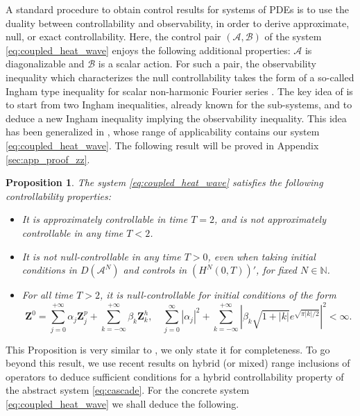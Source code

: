 \documentclass[10pt]{article}
\newtheorem{Proposition}[Theorem]{Proposition}
\begin{document}
A standard procedure to obtain control results for systems of PDEs is to use the duality between controllability and observability, in order to derive approximate, null, or exact controllability. Here, the control pair $(\mathcal{A},\mathcal{B})$ of the system \eqref{eq:coupled_heat_wave} enjoys the following additional properties: $\mathcal{A}$ is diagonalizable and $\mathcal{B}$ is a scalar action. For such a pair, the observability inequality which characterizes the null controllability takes the form of a so-called Ingham type inequality for scalar non-harmonic Fourier series \cite{komornik_loreti}. The key idea of \cite{hansen} is to start from two Ingham inequalities, already known for the sub-systems, and to deduce a new Ingham inequality implying the observability inequality. This idea has been generalized in \cite[Proposition 1.6]{chowdhury}, whose range of applicability contains our system \eqref{eq:coupled_heat_wave}. The following result will be proved in Appendix \ref{sec:app_proof_zz}.
\begin{Proposition}\label{prop:zz_pour_nous}
The system \eqref{eq:coupled_heat_wave} satisfies the following controllability properties: 
\begin{itemize}
\item It is approximately controllable in time $T = 2$, and is not approximately controllable in any time $T < 2$. 
\item It is not null-controllable in any time $T > 0$, even when taking initial conditions in $D(\mathcal{A}^N)$ and controls in $(H^N(0,T))'$, for fixed $N \in \mathbb{N}$.
\item For all time $T > 2$, it is null-controllable for initial conditions of the form
\[
\mathbf{Z}^0 = \sum_{j=0}^{+\infty} \alpha_j \mathbf{Z}_j^p + \sum_{k=-\infty}^{+\infty} \beta_k \mathbf{Z}_k^h,\quad  \sum_{j=0}^\infty |\alpha_j|^2 +  \sum_{k=-\infty}^{+\infty} \left| \beta_k \sqrt{1+|k|}e^{\sqrt{\pi |k|/2}} \right|^2   < \infty.
\]
\end{itemize}
\end{Proposition}
This Proposition is very similar to \cite[Theorem 4.3]{Zhang_Zuazua}, we only state it for completeness. To go beyond this result, we use recent results on hybrid (or mixed) range inclusions of operators \cite{lissy_douglas} to deduce sufficient conditions for a hybrid controllability property of the abstract system \eqref{eq:cascade}. For the concrete system \eqref{eq:coupled_heat_wave} we shall deduce the following. 
\end{document}
